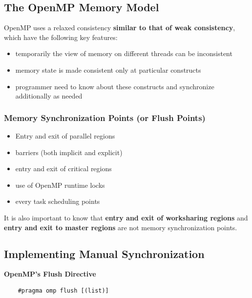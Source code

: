 \documentclass[12pt, a4paper]{report}
\begin{document}
\subsection{The OpenMP Memory Model}
OpenMP uses a relaxed consistency {\bfseries{similar to that of weak consistency}}, which have the following key features:
\begin{itemize}
    \item temporarily the view of memory on different threads can be inconsistent
    \item memory state is made consistent only at particular constructs
    \item programmer need to know about these constructs and synchronize additionally as needed
\end{itemize}

\subsubsection{Memory Synchronization Points (or Flush Points)}
\begin{itemize}
    \item Entry and exit of parallel regions
    \item barriers (both implicit and explicit)
    \item entry and exit of critical regions
    \item use of OpenMP runtime locks
    \item every task scheduling points
\end{itemize}

It is also important to know that {\bfseries{entry and exit of worksharing regions}} and {\bfseries{entry and exit to master regions}} are not memory
synchronization points.

\subsection{Implementing Manual Synchronization}
{\bfseries{OpenMP's Flush Directive}}
\begin{verbatim}
    #pragma omp flush [(list)]
\end{verbatim}
\end{document}
